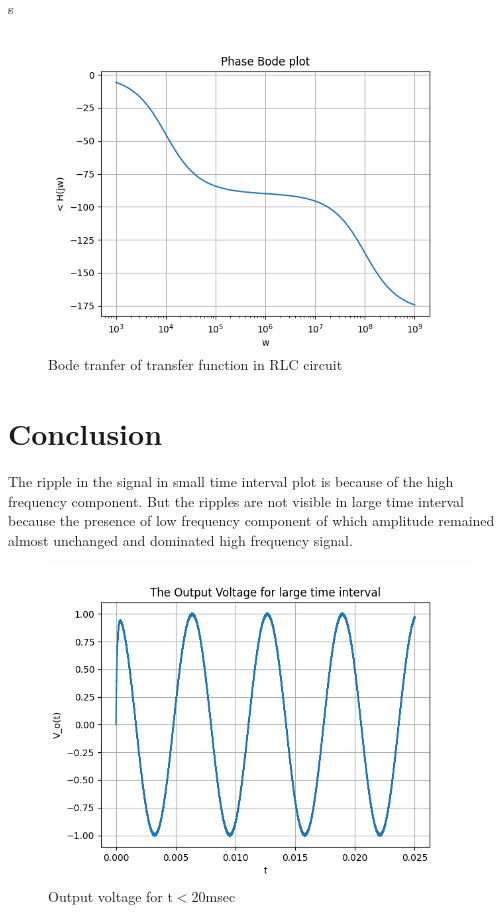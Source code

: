 s\documentclass{article}
\begin{document}
 \begin{figure}[!ht]
  \centering
  \includegraphics[scale=0.7]{Figure_5.png}
  \caption{Bode tranfer of transfer function in RLC circuit}
  \label{fig:sample}
  \end{figure}
 
 \section{Conclusion}
 The ripple in the signal in small time interval plot is because of the high frequency component. But the ripples are not visible in large time interval because the presence of low frequency component of which amplitude remained almost unchanged and dominated high frequency signal.


\begin{figure}[!ht]
  \centering
  \includegraphics[scale=0.7]{Figure_6.png}
  \caption{Output voltage for t$<$20msec}
  \label{fig:sample}
  \end{figure}
  
\end{document}
